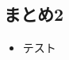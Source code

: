 \documentclass[dvipdfmx, 10.5pt]{beamer}
\begin{document}

\subsection{まとめ2}
\begin{frame}{\insertsubsection}
	\begin{itemize}
		\item テスト
	\end{itemize}

\end{frame}

\end{document}
